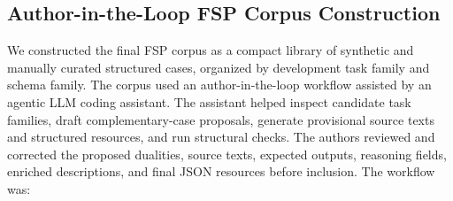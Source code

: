 
\subsection*{Author-in-the-Loop FSP Corpus Construction}

We constructed the final FSP corpus as a compact library of synthetic and manually curated structured cases, organized by development task family and schema family. The corpus used an author-in-the-loop workflow assisted by an agentic LLM coding assistant. The assistant helped inspect candidate task families, draft complementary-case proposals, generate provisional source texts and structured resources, and run structural checks. The authors reviewed and corrected the proposed dualities, source texts, expected outputs, reasoning fields, enriched descriptions, and final JSON resources before inclusion. The workflow was:

